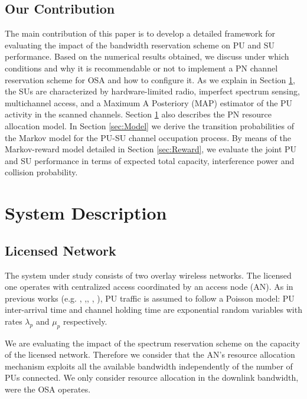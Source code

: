 \subsection{Our Contribution}
The main contribution of this paper is to develop a detailed framework for evaluating the impact of the bandwidth reservation scheme on PU and SU performance.
Based on the numerical results obtained, we discuss under which conditions and why it is recommendable or not to implement a PN channel reservation scheme for OSA and how to configure it.
As we explain in Section \ref{sec:System}, the SUs are characterized by hardware-limited radio, imperfect spectrum sensing, multichannel access, and a Maximum A Posteriory (MAP) estimator of the PU activity in the scanned channels. Section \ref{sec:System} also describes the PN resource allocation model.
In Section \ref{sec:Model} we derive the transition probabilities of the Markov model for the PU-SU channel occupation process.
By means of the Markov-reward model detailed in Section \ref{sec:Reward}, we evaluate the joint PU and SU performance in terms of expected total capacity, interference power and collision probability.

\section{System Description}\label{sec:System}
\subsection{Licensed Network}
The system under study consists of two overlay wireless networks. The licensed one operates with centralized access coordinated by an access node (AN). 
As in previous works (e.g. \cite{ref:POMDP}, \cite{ref:DiscoveringOpportunities},\cite{ref:Gelabert}, \cite{ref:Pla}, \cite{ref:Modelling}), PU traffic is assumed to follow a Poisson model: PU inter-arrival time and channel holding time are exponential random variables with rates $\lambda_{p}$ and $\mu_{p}$ respectively.

We are evaluating the impact of the spectrum reservation scheme on the capacity of the licensed network. Therefore we consider that the AN's resource allocation mechanism exploits all the available bandwidth independently of the number of PUs connected.
We only consider resource allocation in the downlink bandwidth, were the OSA operates.

